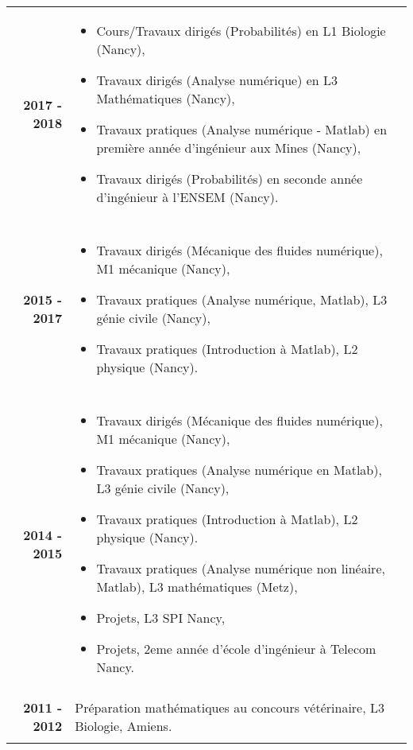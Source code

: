 \documentclass[10pt,a4paper]{report}
\begin{document}
\noindent
\begin{center}
\begin{tabular}{r p{12cm}}
\textbf{2017 - 2018} & \begin{itemize}
\item Cours/Travaux dirigés (Probabilités) en L1 Biologie (Nancy),
\item Travaux dirigés (Analyse numérique) en L3 Mathématiques (Nancy),
\item Travaux pratiques (Analyse numérique - Matlab) en première année d'ingénieur aux Mines (Nancy),
\item Travaux dirigés (Probabilités) en seconde année d'ingénieur à l'ENSEM (Nancy).
\end{itemize}\\

& \\

\textbf{2015 - 2017} & \begin{itemize}
\item Travaux dirigés (Mécanique des fluides numérique), M1 mécanique (Nancy),
\item Travaux pratiques (Analyse numérique, Matlab), L3 génie civile (Nancy),
\item Travaux pratiques (Introduction à Matlab), L2 physique (Nancy).
\end{itemize}\\

& \\

\textbf{2014 - 2015} & \begin{itemize}
\item Travaux dirigés (Mécanique des fluides numérique), M1 mécanique (Nancy),
\item Travaux pratiques (Analyse numérique en Matlab), L3 génie civile (Nancy),
\item Travaux pratiques (Introduction à Matlab), L2 physique (Nancy).
\item Travaux pratiques (Analyse numérique non linéaire, Matlab), L3 mathématiques (Metz),
\item Projets, L3 SPI Nancy,
\item Projets, 2eme année d'école d'ingénieur à Telecom Nancy.
\end{itemize}\\

& \\

\textbf{2011 - 2012} & Préparation mathématiques au concours vétérinaire, L3 Biologie, Amiens.\\

& \\
\end{tabular}
\end{center}
\end{document}
